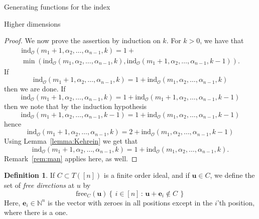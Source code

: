 \documentclass[reqno,a4paper,10pt]{amsart}
\theoremstyle{definition}
\newtheorem{definition}{Definition}
\theoremstyle{remark}
\theoremstyle{plain}
\newcommand{\vek}[1]{\boldsymbol{#1}}
\newcommand\setsuchas[2]{\left\{\,{#1}\,:\,{#2}\,\right\}}
\newcommand{\Nat}{{\mathbb{N}}}
\newcommand{\ind}{\mathrm{ind}}
\begin{document}
\begin{section}{Generating functions for the index}
\begin{subsection}{Higher dimensions}
\begin{proof}
    We now prove the assertion by induction on \(k\).
    For \(k>0\), we have that
    \begin{multline*}
      \ind_{\mathcal{O}}(m_1+1,\alpha_2,\dots,\alpha_{n-1},k) 
      = 1 + \\
      \min(
      \ind_{\mathcal{O}}(m_1,\alpha_2,\dots,\alpha_{n-1},k),
      \ind_{\mathcal{O}}(m_1+1,\alpha_2,\dots,\alpha_{n-1},k-1)
      ).
    \end{multline*}
    If
    \begin{displaymath}
      \ind_{\mathcal{O}}(m_1+1,\alpha_2,\dots,\alpha_{n-1},k) 
      = 1 + \ind_{\mathcal{O}}(m_1,\alpha_2,\dots,\alpha_{n-1},k)
    \end{displaymath}
    then we are done.
    If
    \begin{displaymath}
       \ind_{\mathcal{O}}(m_1+1,\alpha_2,\dots,\alpha_{n-1},k) 
      = 1 + \ind_{\mathcal{O}}(m_1+1,\alpha_2,\dots,\alpha_{n-1},k-1)
    \end{displaymath}
    then we note that by the induction hypothesis
    \begin{displaymath}
      \ind_{\mathcal{O}}(m_1+1,\alpha_2,\dots,\alpha_{n-1},k-1) =
      1+ \ind_{\mathcal{O}}(m_1,\alpha_2,\dots,\alpha_{n-1},k-1)
    \end{displaymath}
    hence
    \begin{displaymath}
      \ind_{\mathcal{O}}(m_1+1,\alpha_2,\dots,\alpha_{n-1},k) 
      = 2 + \ind_{\mathcal{O}}(m_1,\alpha_2,\dots,\alpha_{n-1},k-1)
    \end{displaymath}
    Using Lemma~\ref{lemma:Kehrein} we get that
    \begin{displaymath}
      \ind_{\mathcal{O}}(m_1+1,\alpha_2,\dots,\alpha_{n-1},k) 
      = 1 + \ind_{\mathcal{O}}(m_1,\alpha_2,\dots,\alpha_{n-1},k).
    \end{displaymath}
    Remark~\ref{rem:man} applies here, as well.
  \end{proof}
  


  \begin{definition}
    If \(C \subset T([n])\) is a finite order ideal, and if
    \(\vek{u} \in C\), we define the set of \emph{free
      directions} at \(u\) by
    \begin{equation}
      \label{eq:7}
      \mathrm{free}_{C}(\vek{u}) \setsuchas{i \in [n]}{\vek{u} +
        \vek{e}_i \not \in C}
    \end{equation}
    Here, \(\vek{e}_i \in \Nat^n\) is the vector with zeroes in all
    positions except in the \(i\)'th position, where there  is a one.
  \end{definition}



\end{subsection}
\end{section}
\end{document}
